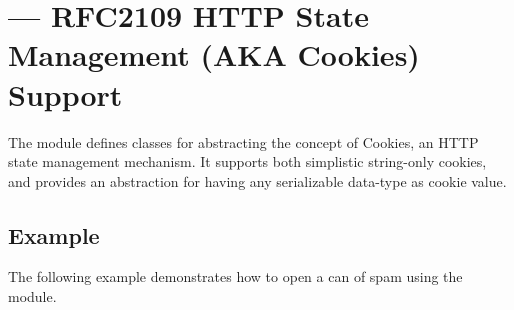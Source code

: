 \section{ ---
         RFC2109 HTTP State Management (AKA Cookies) Support}



The  module defines classes for abstracting the concept of 
Cookies, an HTTP state management mechanism. It supports both simplistic
string-only cookies, and provides an abstraction for having any serializable
data-type as cookie value.

\subsection{Example \label{cookie-example}}

The following example demonstrates how to open a can of spam using the
 module.

